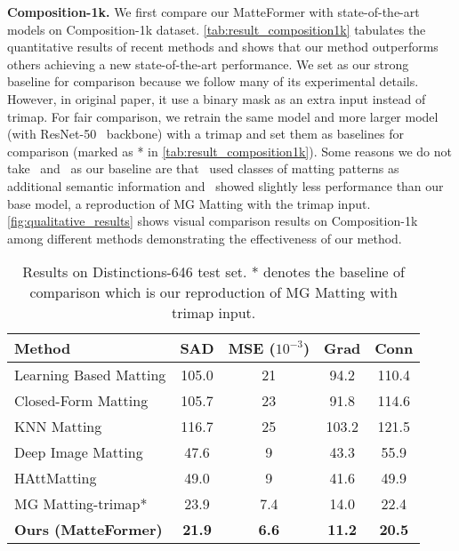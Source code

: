 \documentclass[10pt,twocolumn,letterpaper]{article}
\begin{document}
\textbf{Composition-1k.}
We first compare our MatteFormer with state-of-the-art models on Composition-1k dataset. \cref{tab:result_composition1k} tabulates the quantitative results of recent methods and shows that our method outperforms others achieving a new state-of-the-art performance.
We set\cite{yu2021mask} as our strong baseline for comparison because we follow many of its experimental details. However, in original paper, it use a binary mask as an extra input instead of trimap. For fair comparison, we retrain the same model and more larger model (with ResNet-50~\cite{he2016deep} backbone) with a trimap and set them as baselines for comparison (marked as * in \cref{tab:result_composition1k}).
Some reasons we do not take~\cite{sun2021semantic} and~\cite{liu2021tripartite} as our baseline are that~\cite{sun2021semantic} used classes of matting patterns as additional semantic information and~\cite{liu2021tripartite} showed slightly less performance than our base model, a reproduction of MG Matting with the trimap input.
\cref{fig:qualitative_results} shows visual comparison results on Composition-1k among different methods demonstrating the effectiveness of our method.

\begin{table}[t!]
  \centering
   \begin{adjustbox}{width = \linewidth}
  \begin{tabular}{l | c c c c}
    \toprule
    Method & SAD & \makecell{MSE \\ ($10^{-3}$)} & Grad & Conn\\
    \midrule
    Learning Based Matting \cite{zheng2009learning} & 105.0 & 21 & 94.2 & 110.4 \\
    Closed-Form Matting  \cite{levin2007closed} & 105.7 & 23 & 91.8 & 114.6 \\
    KNN Matting \cite{chen2013knn} & 116.7 & 25 & 103.2 & 121.5 \\
    Deep Image Matting \cite{xu2017deep} & 47.6 & 9 & 43.3 & 55.9 \\
    HAttMatting \cite{qiao2020attention} & 49.0 & 9 & 41.6 & 49.9 \\
    \hline
    MG Matting-trimap* & 23.9 & 7.4 & 14.0 & 22.4 \\
    \bf{Ours (MatteFormer)} & \bf{21.9} & \bf{6.6} & \bf{11.2} & \bf{20.5} \\
    \bottomrule
  \end{tabular}
  \end{adjustbox}
  \caption{Results on Distinctions-646 test set. * denotes the baseline of comparison which is our reproduction of MG Matting with trimap input.}
  \label{tab:result_distinction646}
  \vspace{-2mm}
\end{table}
\end{document}
